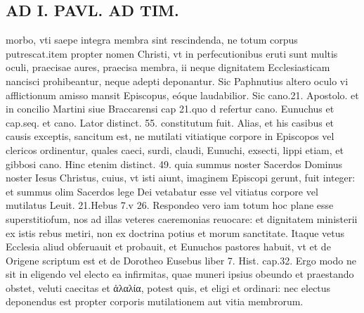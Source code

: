 \documentclass{article}
\begin{document}
\begin{pages}
\section*{AD I. PAVL. AD TIM. }
\marginpar{[ p.124 ]}\pstart morbo, vti saepe integra membra sint rescindenda, ne totum corpus putrescat.item propter nomen Christi, vt in perfecutionibus eruti sunt multis oculi, praecisae aures, praecisa membra, ii neque dignitatem Ecclesiasticam nancisci prohibeantur, neque adepti deponantur. Sic Paphnutius altero oculo vi afflictionum amisso mansit Episcopus, eóque laudabilior. Sic cano.21. Apostolo. et in concilio Martini siue Braccarensi cap 21.quo d refertur cano. Eunuchus et cap.seq. et cano. Lator distinct. 55. constitutum fuit.  \pend\pstart Alias, et his casibus et causis exceptis, sancitum est, ne mutilati vitiatique corpore in Episcopos vel clericos ordinentur, quales caeci, surdi, claudi, Eunuchi, exsecti, lippi etiam, et gibbosi cano. Hinc etenim distinct. 49. quia summus noster Sacerdos Dominus noster Iesus Christus, cuius, vt isti aiunt, imaginem Episcopi gerunt, fuit integer: et summus olim Sacerdos lege Dei vetabatur esse vel vitiatus corpore vel mutilatus Leuit. 21.Hebus 7.v 26. Respondeo vero iam totum hoc plane esse superstitiofum, nos ad illas veteres caeremonias reuocare: et dignitatem ministerii ex istis rebus metiri, non ex doctrina potius et morum sanctitate. Itaque vetus Ecclesia aliud obferuauit et probauit, et Eunuchos pastores habuit, vt et de Origene scriptum est et de Dorotheo Eusebus liber  7. Hist. cap.32. Ergo modo ne sit in eligendo vel electo ea infirmitas, quae muneri ipsius obeundo et praestando obstet, veluti caecitas et ἀλαλία, potest quis, et eligi et ordinari: nec electus deponendus est propter corporis mutilationem aut vitia membrorum.  \pend

\end{pages}
\end{document}
